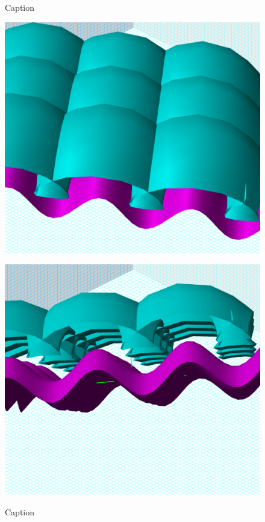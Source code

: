 {\begin{figure}[H]
\begin{minipage}[b]{\w}
      \caption{Caption}
      \vspace{4ex}
    \end{minipage} %
    \begin{minipage}[b]{\w}
      \centering
      \label{surface:3}
      \includegraphics[width=\fw]{img/16-surface/03.png}
      \caption{Caption}
      \vspace{4ex}
    \end{minipage} %
    \begin{minipage}[b]{\w}
      \centering
      \label{surface:4}
      \includegraphics[width=\fw]{img/16-surface/04.png}

\end{minipage}
\end{figure}}
